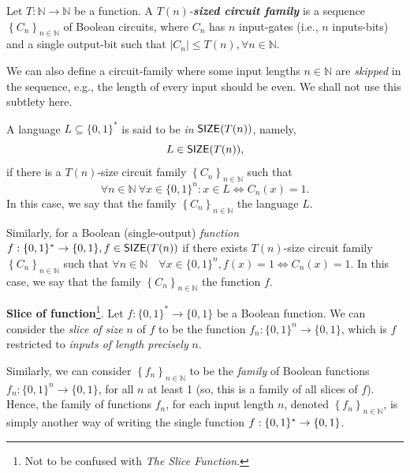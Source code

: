 \begin{tcolorbox}[float=t, colframe=white, colback=red!5, boxrule=0mm, sharp corners]
\begin{definition}
Let $T:\mathbb{N}\rightarrow \mathbb{N}$ be a function. 
A \emph{$T(n)$-\textbf{sized circuit family}} is a sequence $\left\{C_n\right\}_{n \in \mathbb{N}}$ of Boolean circuits, where $C_n$ has $n$ input-gates (i.e., $n$ inputs-bits) and a single output-bit such that  $\left|C_n\right| \leq T(n), \forall n \in \mathbb{N}$.
\end{definition}
\end{tcolorbox}

\begin{remark}We can also define a circuit-family where some input lengths $n\in\mathbb{N}$ are \emph{skipped} in the sequence, e.g.,  the length of every input should be even. We shall not use this subtlety here.
\end{remark}

A language $L\subseteq\{0,1\}^*$ is said to be \emph{in} $\operatorname{{\mathsf{SIZE}}} (T(n))$, namely, $$L\in\operatorname{{\mathsf{SIZE}}} (T(n)),$$ if there is a $T(n)$-size circuit family $\left\{C_n\right\}_{n \in \mathbb{N}}$ such that 
$$\forall n \in \mathbb{N~} \forall x \in\{0,1\}^n: x \in L \Leftrightarrow C_n(x)=1.$$
In this case, we say that 
the family $\left\{C_n\right\}_{n \in \mathbb{N}}$  the language $L$.


Similarly, for a Boolean (single-output) \emph{function} $f:\{0,1\}^* \rightarrow\{0,1\}, f \in \operatorname{{\mathsf{SIZE}}}(T(n))$ if there exists $ T(n)$-size circuit family $\left\{C_n\right\}_{n \in \mathbb{N}}$ such that  $\forall n \in \mathbb{N} \quad \forall x \in\{0,1\}^n, f(x)=1 \Leftrightarrow C_n(x)=1$.
In this case, we say that 
the family $\left\{C_n\right\}_{n \in \mathbb{N}}$  the function $f$.




\begin{tcolorbox}[float=t, colframe=white, colback=red!5, boxrule=0mm, sharp corners]
\textbf{Slice of function}\footnote{Not to be confused with \emph{The Slice Function}.}. 
 Let $f:\{0,1\}^*\to\{0,1\}$ be a Boolean function.
We can consider the \emph{slice} \emph{of size} $n$ of $f$ to be the function $f_n:\{0,1\}^n\to\{0,1\}$, which is $f$ restricted to \emph{inputs of length precisely} $n$. 
\end{tcolorbox}

Similarly, we can consider $\left\{f_{n}\right\}_{n\in\mathbb{N}}$ to be the \textit{family} of Boolean functions $f_n:\{0,1\}^n\to \{0,1\}$, 
for all $n$ at least 1 (so, this is a family of all slices of $f$). Hence, the family of functions $f_n$, for each input length $n$, denoted  $\left\{f_{n}\right\}_{n\in\mathbb{N}}$, is simply another way of writing the single function $f:\{0,1\}^*\to\{0,1\}$. 





